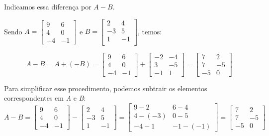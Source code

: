 Indicamos essa diferença por $A - B$.
\begin{example}
	Sendo $A = \begin{bmatrix}
			9  & 6  \\
			4  & 0  \\
			-4 & -1
		\end{bmatrix}$ e $B = \begin{bmatrix}
			2  & 4  \\
			-3 & 5  \\
			1  & -1 \\
		\end{bmatrix}$, temos:

	\begin{equation*}
		A - B = A + (-B) = \begin{bmatrix}
			9  & 6  \\
			4  & 0  \\
			-4 & -1
		\end{bmatrix} + \begin{bmatrix}
			-2 & -4 \\
			3  & -5 \\
			-1 & 1
		\end{bmatrix} = \begin{bmatrix}
			7  & 2  \\
			7  & -5 \\
			-5 & 0
		\end{bmatrix}
	\end{equation*}

	Para simplificar esse procedimento, podemos subtrair os elementos correspondentes em \textit{A} e \textit{B}:
	\begin{equation*}
		A - B = \begin{bmatrix}
			9  & 6  \\
			4  & 0  \\
			-4 & -1
		\end{bmatrix} - \begin{bmatrix}
			2  & 4  \\
			-3 & 5  \\
			1  & -1
		\end{bmatrix} = \begin{bmatrix}
			9 -2     & 6 - 4     \\
			4 - (-3) & 0 - 5     \\
			-4 -1    & -1 - (-1)
		\end{bmatrix} = \begin{bmatrix}
			7  & 2  \\
			7  & -5 \\
			-5 & 0
		\end{bmatrix}
	\end{equation*}
\end{example}

